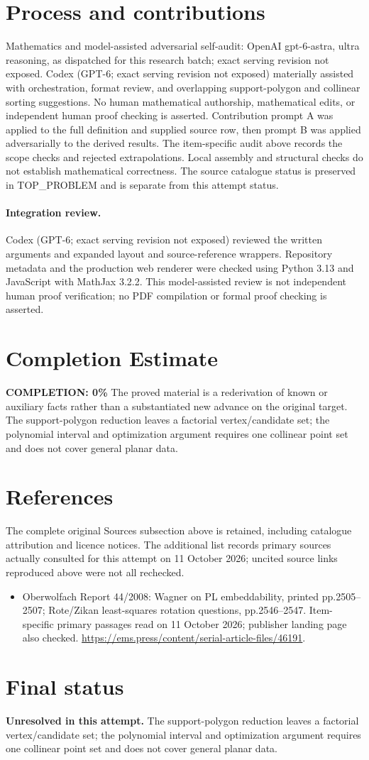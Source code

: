 \documentclass[11pt]{article}
\begin{document}
\section{Process and contributions}
Mathematics and model-assisted adversarial self-audit: OpenAI gpt-6-astra, ultra reasoning, as dispatched for this research batch; exact serving revision not exposed. Codex (GPT-6; exact serving revision not exposed) materially assisted with orchestration, format review, and overlapping support-polygon and collinear sorting suggestions. No human mathematical authorship, mathematical edits, or independent human proof checking is asserted.
Contribution prompt A was applied to the full definition and supplied source row, then prompt B was applied adversarially to the derived results. The item-specific audit above records the scope checks and rejected extrapolations. Local assembly and structural checks do not establish mathematical correctness. The source catalogue status is preserved in TOP\_PROBLEM and is separate from this attempt status.
\paragraph{Integration review.} Codex (GPT-6; exact serving revision not exposed) reviewed the written arguments and expanded layout and source-reference wrappers. Repository metadata and the production web renderer were checked using Python 3.13 and JavaScript with MathJax 3.2.2. This model-assisted review is not independent human proof verification; no PDF compilation or formal proof checking is asserted.

\section{Completion Estimate}
\noindent\textbf{COMPLETION: 0\%}
The proved material is a rederivation of known or auxiliary facts rather than a substantiated new advance on the original target. The support-polygon reduction leaves a factorial vertex/candidate set; the polynomial interval and optimization argument requires one collinear point set and does not cover general planar data.
\section{References}
The complete original Sources subsection above is retained, including catalogue attribution and licence notices. The additional list records primary sources actually consulted for this attempt on 11 October 2026; uncited source links reproduced above were not all rechecked.
\begin{itemize}
\item Oberwolfach Report 44/2008: Wagner on PL embeddability, printed pp.2505--2507; Rote/Zikan least-squares rotation questions, pp.2546--2547. Item-specific primary passages read on 11 October 2026; publisher landing page also checked. \url{https://ems.press/content/serial-article-files/46191}.
\end{itemize}
\section{Final status}
\textbf{Unresolved in this attempt.} The support-polygon reduction leaves a factorial vertex/candidate set; the polynomial interval and optimization argument requires one collinear point set and does not cover general planar data.
\end{document}

